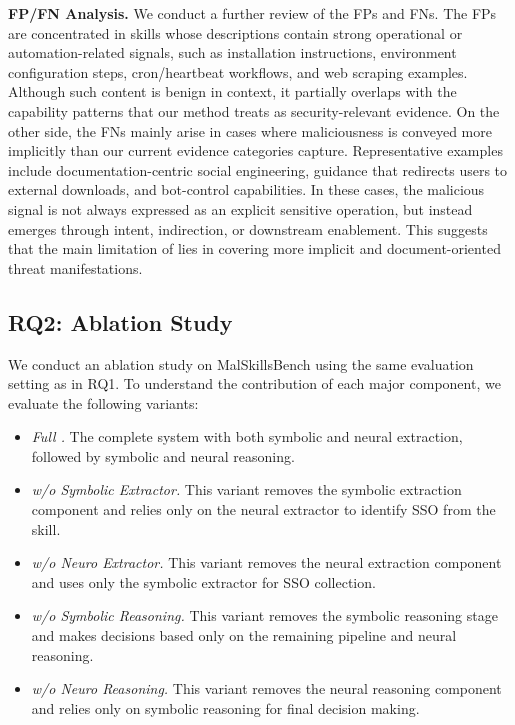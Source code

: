 \noindent \textbf{FP/FN Analysis.}
We conduct a further review of the FPs and FNs. The FPs are concentrated in skills whose descriptions contain strong operational or automation-related signals, such as installation instructions, environment configuration steps, cron/heartbeat workflows, and web scraping examples. Although such content is benign in context, it partially overlaps with the capability patterns that our method treats as security-relevant evidence. 
On the other side, the FNs mainly arise in cases where maliciousness is conveyed more implicitly than our current evidence categories capture. Representative examples include documentation-centric social engineering, guidance that redirects users to external downloads, and bot-control capabilities. In these cases, the malicious signal is not always expressed as an explicit sensitive operation, but instead emerges through intent, indirection, or downstream enablement. This suggests that the main limitation of \toolname lies in covering more implicit and document-oriented threat manifestations.

\subsection{RQ2: Ablation Study}
\label{sec:rq2}

We conduct an ablation study on MalSkillsBench using the same evaluation setting as in RQ1. To understand the contribution of each major component, we evaluate the following variants:

\begin{itemize}[leftmargin=15pt]
    \item \textit{Full \toolname.} The complete system with both symbolic and neural extraction, followed by symbolic and neural reasoning.

    \item \textit{w/o Symbolic Extractor.} This variant removes the symbolic extraction component and relies only on the neural extractor to identify SSO from the skill.

    \item \textit{w/o Neuro Extractor.} This variant removes the neural extraction component and uses only the symbolic extractor for SSO collection.

    \item \textit{w/o Symbolic Reasoning.} This variant removes the symbolic reasoning stage and makes decisions based only on the remaining pipeline and neural reasoning.

    \item \textit{w/o Neuro Reasoning.} This variant removes the neural reasoning component and relies only on symbolic reasoning for final decision making.
\end{itemize}

